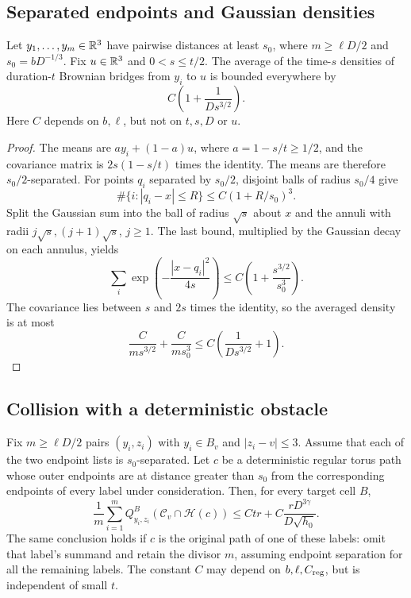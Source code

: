 \subsection{Separated endpoints and Gaussian densities}

\begin{lemma}\label{lem:gaussian-packing}
Let $y_1,\ldots,y_m\in\mathbb R^3$ have pairwise distances at least $s_0$, where
$m\ge\ell D/2$ and $s_0=bD^{-1/3}$.  Fix $u\in\mathbb R^3$ and
$0<s\le t/2$.  The average of the time-$s$ densities of duration-$t$
Brownian bridges from $y_i$ to $u$ is bounded everywhere by
\begin{equation}\label{bridge:packed-density}
 C\left(1+\frac{1}{D s^{3/2}}\right).
\end{equation}
Here $C$ depends on $b,\ell$, but not on $t,s,D$ or $u$.
\end{lemma}

\begin{proof}
The means are $a y_i+(1-a)u$, where $a=1-s/t\ge1/2$, and the covariance
matrix is $2s(1-s/t)$ times the identity.  The means are therefore
$s_0/2$-separated.  For points $q_i$ separated by $s_0/2$, disjoint balls
of radius $s_0/4$ give
\[
 \#\{i:|q_i-x|\le R\}\le C(1+R/s_0)^3.
\]
Split the Gaussian sum into the ball of radius $\sqrt{s}$ about $x$ and
the annuli with radii $j\sqrt{s},(j+1)\sqrt{s}$, $j\ge1$.  The last
bound, multiplied by the Gaussian decay on each annulus, yields
\[
 \sum_i \exp\!\left(-\frac{|x-q_i|^2}{4s}\right)
 \le C\left(1+\frac{s^{3/2}}{s_0^3}\right).
\]
The covariance lies between $s$ and $2s$ times the identity, so the
averaged density is at most
\[
 \frac{C}{m s^{3/2}}+\frac{C}{m s_0^3}
 \le C\left(\frac{1}{D s^{3/2}}+1\right).
\]
\end{proof}

\subsection{Collision with a deterministic obstacle}

\begin{lemma}\label{lem:averaged-hit}
Fix $m\ge\ell D/2$ pairs $(y_i,z_i)$ with $y_i\in B_v$ and
$|z_i-v|\le3$.  Assume that each of the two endpoint lists is
$s_0$-separated.  Let $c$ be a deterministic regular torus path whose
outer endpoints are at distance greater than $s_0$ from the corresponding
endpoints of every label under consideration.  Then, for every target
cell $B$,
\begin{equation}\label{bridge:averaged-estimate}
 \frac1m\sum_{i=1}^m
 Q_{y_i,z_i}^{B}(\mathcal C_v\cap\mathcal H(c))
 \le Ctr+C\frac{rD^{3\gamma}}{D\sqrt{h_0}}.
\end{equation}
The same conclusion holds if $c$ is the original path of one of these
labels: omit that label's summand and retain the divisor $m$, assuming
endpoint separation for all the remaining labels.  The constant $C$ may
depend on $b,\ell,C_{\rm reg}$, but is independent of small $t$.
\end{lemma}

